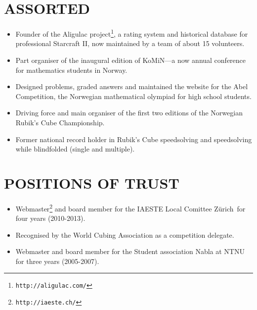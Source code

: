 \documentclass[line,margin]{res}
\newcommand{\zh}{Z\"{u}rich}
\begin{document}
\begin{resume}
\section{ASSORTED}

\begin{itemize}
\item Founder of the Aligulac project\footnote{{\tt http://aligulac.com/}}, a rating system and
  historical database for professional Starcraft II, now maintained by a team of about 15 volunteers.
\item Part organiser of the inaugural edition of KoMiN---a now annual conference for mathematics
  students in Norway.
\item Designed problems, graded answers and maintained the website for the Abel Competition, the
  Norwegian mathematical olympiad for high school students.
\item Driving force and main organiser of the first two editions of the Norwegian Rubik's Cube
  Championship.
\item Former national record holder in Rubik's Cube speedsolving and speedsolving while blindfolded
  (single and multiple).
\end{itemize}


\section{POSITIONS OF TRUST}

\begin{itemize}
\item Webmaster\footnote{{\tt http://iaeste.ch/}} and board member for the IAESTE Local Comittee
  \zh\ for four years (2010-2013).
\item Recognised by the World Cubing Association as a competition delegate.
\item Webmaster and board member for the Student association Nabla at NTNU for three years
  (2005-2007).
\end{itemize}







\end{resume}
\end{document}
